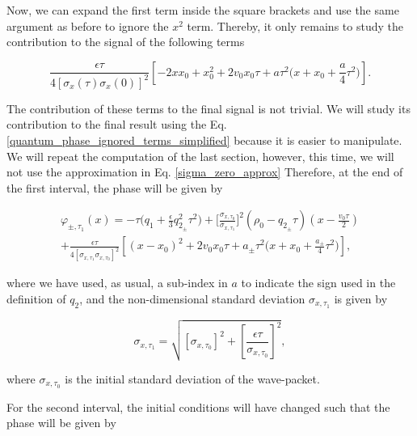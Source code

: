 \documentclass{article}
\begin{document}
Now, we can expand the first term inside the square brackets and use the same argument as before to ignore the $x^{2}$ term. Thereby, it only remains to study the contribution to the signal of the following terms

\begin{equation}\label{quantum_phase_ignored_terms_simplified_expanded}
\frac{\epsilon \tau}{4 [\sigma_{x}(\tau)\sigma_{x}(0)]^{2}} \left[-2x x_{0}+x_{0}^{2} + 2v_{0} x_{0} \tau +a \tau^{2} \bigg(x+x_{0}+ \frac{a}{4} \tau^{2} \bigg)\right].
\end{equation}

The contribution of these terms to the final signal is not trivial. We will study its contribution to the final result using the Eq. \ref{quantum_phase_ignored_terms_simplified}  because it is easier to manipulate. We will repeat the computation of the last section, however, this time, we will not use the approximation in Eq. \ref{sigma_zero_approx} Therefore, at the end of the first interval, the phase will be given by

\begin{multline}\label{quantum_phase_ignored_terms_simplified_t1}
\varphi_{\pm, \tau_{1}}(x) =-\tau \bigg(q_{1} + \frac{\epsilon}{3} q_{2_{\pm}}^{2} \tau^{2}\bigg) + \bigg[\frac{\sigma_{x, \tau_{0}}}{\sigma_{x, \tau_{1}}}\bigg]^{2}(\rho_{0} - q_{2_{\pm}} \tau)(x-\frac{v_{0} \tau}{2}) \\
+ \frac{\epsilon \tau}{4 [\sigma_{x, \tau_{1}}\sigma_{x, \tau_{0}}]^{2}} \left[(x-x_{0})^{2} + 2v_{0} x_{0} \tau +a_{\pm} \tau^{2} \bigg(x+x_{0}+ \frac{a_{\pm}}{4} \tau^{2} \bigg)\right],
\end{multline}

where we have used, as usual, a sub-index in $a$ to indicate the sign used in the definition of $q_{2}$, and the non-dimensional standard deviation $\sigma_{x, \tau_{1}}$ is given by 

\begin{equation}\label{sigma_x_t1}
\sigma_{x, \tau_{1}} = \sqrt{[\sigma_{x, \tau_{0}}]^{2} + \left[\frac{\epsilon \tau}{\sigma_{x, \tau_{0}}} \right]^{2}},
\end{equation}

where $\sigma_{x, \tau_{0}}$ is the initial standard deviation of the wave-packet.

For the second interval, the initial conditions will have changed such that the phase will be given by
\end{document}
